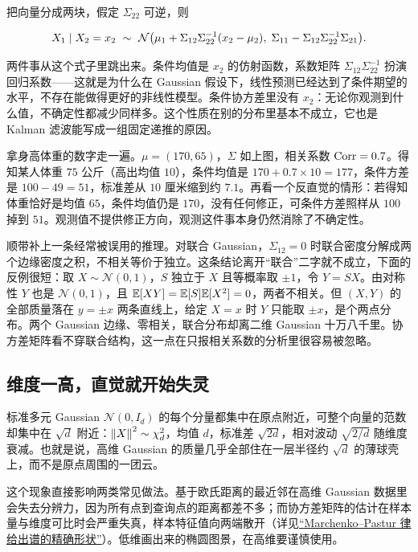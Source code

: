 把向量分成两块，假定 \(\Sigma_{22}\) 可逆，则

\[
X_1\mid X_2=x_2\ \sim\
\mathcal N\bigl(\mu_1+\Sigma_{12}\Sigma_{22}^{-1}(x_2-\mu_2),\;
\Sigma_{11}-\Sigma_{12}\Sigma_{22}^{-1}\Sigma_{21}\bigr).
\]

两件事从这个式子里跳出来。条件均值是 \(x_2\) 的仿射函数，系数矩阵 \(\Sigma_{12}\Sigma_{22}^{-1}\) 扮演回归系数——这就是为什么在 Gaussian 假设下，线性预测已经达到了条件期望的水平，不存在能做得更好的非线性模型。条件协方差里没有 \(x_2\)：无论你观测到什么值，不确定性都减少同样多。这个性质在别的分布里基本不成立，它也是 Kalman 滤波能写成一组固定递推的原因。

拿身高体重的数字走一遍。\(\mu=(170,65)\)，\(\Sigma\) 如上图，相关系数 \(\operatorname{Corr}=0.7\)。得知某人体重 \(75\) 公斤（高出均值 \(10\)），条件均值是 \(170+0.7\times10=177\)，条件方差是 \(100-49=51\)，标准差从 \(10\) 厘米缩到约 \(7.1\)。再看一个反直觉的情形：若得知体重恰好是均值 \(65\)，条件均值仍是 \(170\)，没有任何修正，可条件方差照样从 \(100\) 掉到 \(51\)。观测值不提供修正方向，观测这件事本身仍然消除了不确定性。

顺带补上一条经常被误用的推理。对联合 Gaussian，\(\Sigma_{12}=0\) 时联合密度分解成两个边缘密度之积，不相关等价于独立。这条结论离开``联合''二字就不成立，下面的反例很短：取 \(X\sim\mathcal N(0,1)\)，\(S\) 独立于 \(X\) 且等概率取 \(\pm1\)，令 \(Y=SX\)。由对称性 \(Y\) 也是 \(\mathcal N(0,1)\)，且 \(\mathbb{E}[XY]=\mathbb{E}[S]\mathbb{E}[X^2]=0\)，两者不相关。但 \((X,Y)\) 的全部质量落在 \(y=\pm x\) 两条直线上，给定 \(X=x\) 时 \(Y\) 只能取 \(\pm x\)，是个两点分布。两个 Gaussian 边缘、零相关，联合分布却离二维 Gaussian 十万八千里。协方差矩阵看不穿联合结构，这一点在只报相关系数的分析里很容易被忽略。

\subsection{维度一高，直觉就开始失灵}

标准多元 Gaussian \(\mathcal N(0,I_d)\) 的每个分量都集中在原点附近，可整个向量的范数却集中在 \(\sqrt d\) 附近：\(\left\lVert X\right\rVert^2\sim\chi^2_d\)，均值 \(d\)，标准差 \(\sqrt{2d}\)，相对波动 \(\sqrt{2/d}\) 随维度衰减。也就是说，高维 Gaussian 的质量几乎全部住在一层半径约 \(\sqrt d\) 的薄球壳上，而不是原点周围的一团云。

这个现象直接影响两类常见做法。基于欧氏距离的最近邻在高维 Gaussian 数据里会失去分辨力，因为所有点到查询点的距离都差不多；而协方差矩阵的估计在样本量与维度可比时会严重失真，样本特征值向两端散开（详见\hyperref[sec:11-Mathematical-Statistics/09-Random-Matrix-Theory/02]{``Marchenko--Pastur 律给出谱的精确形状''}）。低维画出来的椭圆图景，在高维要谨慎使用。

